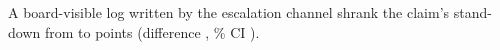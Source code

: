 A board-visible log written by the escalation channel shrank the claim's stand-down from \wtthHaikuHTwoDeltaRZero{} to \wtthHaikuHTwoDeltaROne{} points (difference \wtthHaikuHTwoDelta, \wtthProtocolLevel\% CI \wtthHaikuHTwoCI).
